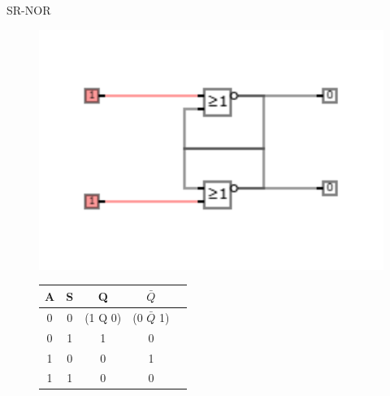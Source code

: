 \documentclass[12pt]{article}
\begin{document}
\newpage
SR-NOR
\begin{figure}[h!]
    \begin{minipage}{0.45\textwidth}
        \includegraphics[scale=0.5]{Schema4.png}
    \end{minipage}
    \hfill
    \begin{minipage}{0.3\textwidth}
        \begin{tabular}{|c|c|c|c|c|}
            \hline
            A & S & Q & $\bar{Q}$ \\ \hline
            0 & 0 & (1 Q 0) & (0 $\bar{Q}$ 1) \\ \hline
            0 & 1 & 1 & 0 \\ \hline
            1 & 0 & 0 & 1 \\ \hline
            1 & 1 & 0 & 0 \\ \hline
        \end{tabular}
    \end{minipage}
\end{figure}
\end{document}
